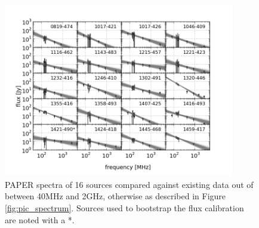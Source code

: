 \documentclass[preprint]{aastex}
\begin{document}
\begin{figure}[htbp]
\begin{center}
\includegraphics[width=0.9\textwidth]{plots/srcfig_2.png}
\caption{
PAPER spectra of 16 sources compared against existing data out of
\cite{Vollmer:2010p6422} between 40MHz and 2GHz, otherwise as described in
Figure \ref{fig:pic_spectrum}.\label{fig:srcs2} Sources used to bootstrap the
flux calibration are noted with a *.
}
\end{center}
\end{figure}
\end{document}
